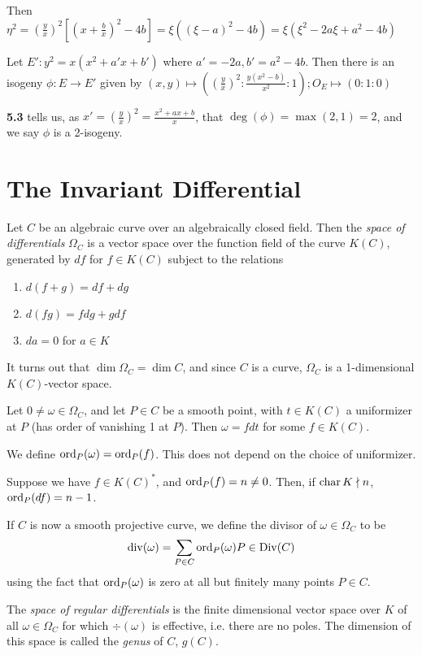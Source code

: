 \documentclass[10pt,a4paper]{article}
\begin{document}
Then $\eta^2=\left(\frac{y}{x}\right)^2\left[\left(x+\frac{b}{x}\right)^2-4b\right] = \xi\left((\xi-a)^2-4b\right) = \xi(\xi^2-2a\xi+a^2-4b)$

Let $E': y^2=x(x^2+a'x+b')$ where $a' = -2a, b'=a^2-4b$. Then there is an isogeny $\phi:E \to E'$ given by $(x, y) \mapsto \left(\left(\frac{y}{x}\right)^2:\frac{y(x^2-b)}{x^2}:1\right); O_E \mapsto (0:1:0)$

\textbf{5.3} tells us, as $x' = \left(\frac{y}{x}\right)^2 = \frac{x^2+ax+b}{x}$, that $\deg(\phi) = \max(2,1) = 2$, and we say $\phi$ is a 2-isogeny.

\section{The Invariant Differential}
Let $C$ be an algebraic curve over an algebraically closed field. Then the \emph{space of differentials} $\Omega_C$ is a vector space over the function field of the curve $K(C)$, generated by $df$ for $f \in K(C)$ subject to the relations
\begin{enumerate}
  \item $d(f+g) = df+dg$
  \item $d(fg) = fdg+gdf$
  \item $da = 0$ for $a \in K$
\end{enumerate}
It turns out that $\dim \Omega_C = \dim C$, and since $C$ is a curve, $\Omega_C$ is a 1-dimensional $K(C)$-vector space.

Let $0\neq \omega \in \Omega_C$, and let $P \in C$ be a smooth point, with $t \in K(C)$ a uniformizer at $P$ (has order of vanishing 1 at $P$). Then $\omega = fdt$ for some $f \in K(C)$.

We define $\operatorname{ord}_P(\omega) = \operatorname{ord}_P(f)$. This does not depend on the choice of uniformizer.

Suppose we have $f \in K(C)^\ast$, and $\operatorname{ord}_P(f) = n \neq 0$. Then, if $\operatorname{char} K \nmid n$, $\operatorname{ord}_P(df) = n-1$.

If $C$ is now a smooth projective curve, we define the divisor of $\omega \in \Omega_C$ to be
\[\operatorname{div}(\omega) = \sum_{P \in C} \operatorname{ord}_P(\omega) P \in \operatorname{Div}(C)\]
using the fact that $\operatorname{ord}_P(\omega)$ is zero at all but finitely many points $P \in C$.

The \emph{space of regular differentials} is the finite dimensional vector space over $K$ of all $\omega \in \Omega_C$ for which $\div(\omega)$ is effective, i.e. there are no poles. The dimension of this space is called the \emph{genus} of $C$, $g(C)$.
\end{document}
